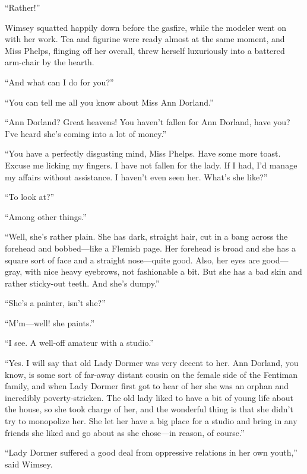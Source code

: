 \enquote{Rather!}

Wimsey squatted happily down before the gasfire, while the modeler went on with her work. Tea and figurine were ready almost at the same moment, and Miss Phelps, flinging off her overall, threw herself luxuriously into a battered arm-chair by the hearth.

\enquote{And what can I do for you?}

\enquote{You can tell me all you know about Miss Ann Dorland.}

\enquote{Ann Dorland? Great heavens! You haven't fallen for Ann Dorland, have you? I've heard she's coming into a lot of money.}

\enquote{You have a perfectly disgusting mind, Miss Phelps. Have some more toast. Excuse me licking my fingers. I have not fallen for the lady. If I had, I'd manage my affairs without assistance. I haven't even seen her. What's she like?}

\enquote{To look at?}

\enquote{Among other things.}

\enquote{Well, she's rather plain. She has dark, straight hair, cut in a bang across the forehead and bobbed\allowbreak---\allowbreak like a Flemish page. Her forehead is broad and she has a square sort of face and a straight nose\allowbreak---\allowbreak quite good. Also, her eyes are good\allowbreak---\allowbreak gray, with nice heavy eyebrows, not fashionable a bit. But she has a bad skin and rather sticky-out teeth. And she's dumpy.}

\enquote{She's a painter, isn't she?}

\enquote{M'm\allowbreak---\allowbreak well! she paints.}

\enquote{I see. A well-off amateur with a studio.}

\enquote{Yes. I will say that old Lady Dormer was very decent to her. Ann Dorland, you know, is some sort of far-away distant cousin on the female side of the Fentiman family, and when Lady Dormer first got to hear of her she was an orphan and incredibly poverty-stricken. The old lady liked to have a bit of young life about the house, so she took charge of her, and the wonderful thing is that she didn't try to monopolize her. She let her have a big place for a studio and bring in any friends she liked and go about as she chose\allowbreak---\allowbreak in reason, of course.}

\enquote{Lady Dormer suffered a good deal from oppressive relations in her own youth,} said Wimsey.

